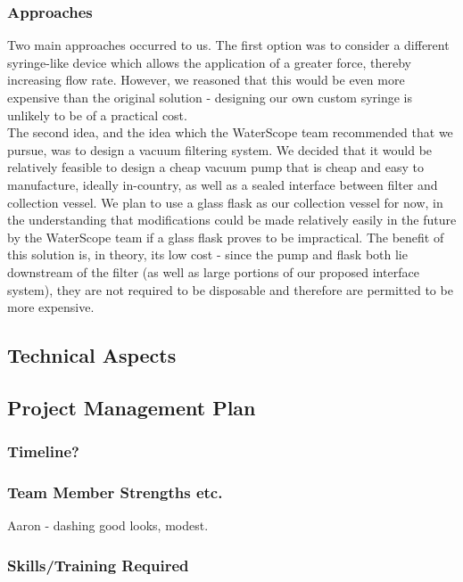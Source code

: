 \documentclass[12pt]{article}
\begin{document}
\subsubsection{Approaches}
Two main approaches occurred to us. The first option was to consider a different syringe-like device which allows the application of a greater force, thereby increasing flow rate. However, we reasoned that this would be even more expensive than the original solution - designing our own custom syringe is unlikely to be of a practical cost.\\
The second idea, and the idea which the WaterScope team recommended that we pursue, was to design a vacuum filtering system. We decided that it would be relatively feasible to design a cheap vacuum pump that is cheap and easy to manufacture, ideally in-country, as well as a sealed interface between filter and collection vessel. We plan to use a glass flask as our collection vessel for now, in the understanding that modifications could be made relatively easily in the future by the WaterScope team if a glass flask proves to be impractical. The benefit of this solution is, in theory, its low cost - since the pump and flask both lie downstream of the filter (as well as large portions of our proposed interface system), they are not required to be disposable and therefore are permitted to be more expensive.
\subsection{Technical Aspects}

\subsection{Project Management Plan}

\subsubsection{Timeline?}

\subsubsection{Team Member Strengths etc.}
Aaron - dashing good looks, modest.

\subsubsection{Skills/Training Required}
\end{document}
